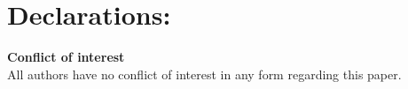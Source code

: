 \documentclass[12pt]{article}
\theoremstyle{plain}
\theoremstyle{definition}
\begin{document}
	
\section{Declarations:}

\textbf{Conflict of interest} \\
All authors have no conflict of interest in any form regarding this paper.















































\end{document}
